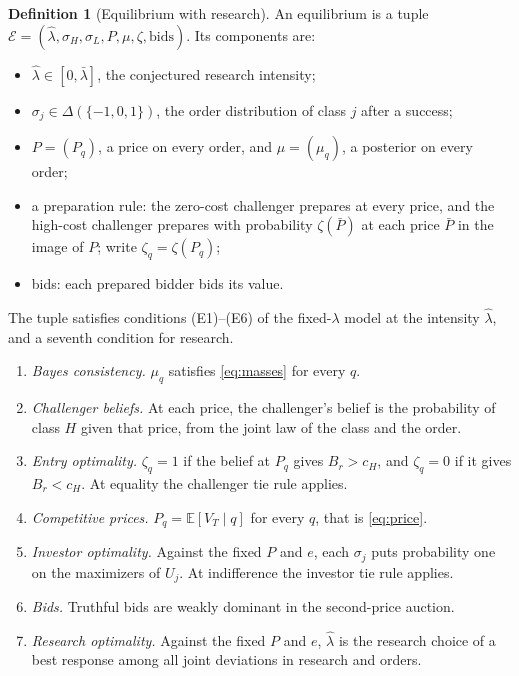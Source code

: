 \documentclass[12pt]{article}
\theoremstyle{definition}
\newtheorem{definition}{Definition}
\theoremstyle{remark}
\newcommand{\E}{\mathbb E}
\newcommand{\lh}{\hat\lambda}
\newcommand{\lb}{\bar\lambda}
\begin{document}
\begin{definition}[Equilibrium with research]\label{def:eq}
An equilibrium is a tuple $\mathcal E=(\lh,\sigma_H,\sigma_L,P,\mu,\zeta,\text{bids})$. Its components are:
\begin{itemize}[nosep]
\item $\lh\in[0,\lb]$, the conjectured research intensity;
\item $\sigma_j\in\Delta(\{-1,0,1\})$, the order distribution of class $j$ after a success;
\item $P=(P_q)$, a price on every order, and $\mu=(\mu_q)$, a posterior on every order;
\item a preparation rule: the zero-cost challenger prepares at every price, and the high-cost challenger prepares
  with probability $\zeta(\bar P)$ at each price $\bar P$ in the image of $P$; write $\zeta_q=\zeta(P_q)$;
\item bids: each prepared bidder bids its value.
\end{itemize}
The tuple satisfies conditions (E1)--(E6) of the fixed-$\lambda$ model at the intensity $\lh$, and a seventh
condition for research.
\begin{enumerate}[label=(E\arabic*),nosep]
\item \emph{Bayes consistency.} $\mu_q$ satisfies \eqref{eq:masses} for every $q$.
\item \emph{Challenger beliefs.} At each price, the challenger's belief is the probability of class $H$ given
  that price, from the joint law of the class and the order.
\item \emph{Entry optimality.} $\zeta_q=1$ if the belief at $P_q$ gives $B_r>c_H$, and $\zeta_q=0$ if it gives
  $B_r<c_H$. At equality the challenger tie rule applies.
\item \emph{Competitive prices.} $P_q=\E[V_T\mid q]$ for every $q$, that is \eqref{eq:price}.
\item \emph{Investor optimality.} Against the fixed $P$ and $e$, each $\sigma_j$ puts probability one on the
  maximizers of $U_j$. At indifference the investor tie rule applies.
\item \emph{Bids.} Truthful bids are weakly dominant in the second-price auction.
\item \emph{Research optimality.} Against the fixed $P$ and $e$, $\lh$ is the research choice of a best response
  among all joint deviations in research and orders.
\end{enumerate}
\end{definition}
\end{document}
